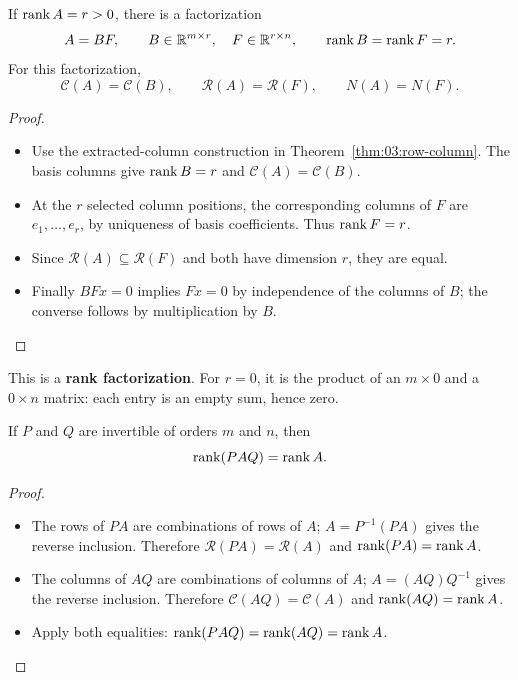 \begin{proposition}\label{prop:03:factorization}
If \(\operatorname{rank} A=r>0\), there is a factorization
\[
A=BF,\qquad B\in\mathbb R^{m\times r},\quad F\in\mathbb R^{r\times n},
\qquad\operatorname{rank} B=\operatorname{rank} F=r.
\]
For this factorization,
\[
\mathcal C(A)=\mathcal C(B),\qquad
\mathcal R(A)=\mathcal R(F),\qquad N(A)=N(F).
\]
\end{proposition}
\begin{proof}
\begin{itemize}
\item Use the extracted-column construction in Theorem~\ref{thm:03:row-column}.
The basis columns give \(\operatorname{rank} B=r\) and \(\mathcal C(A)=\mathcal C(B)\).
\item At the \(r\) selected column positions, the corresponding columns of \(F\)
are \(e_1,\ldots,e_r\), by uniqueness of basis coefficients.
Thus \(\operatorname{rank} F=r\).
\item Since \(\mathcal R(A)\subseteq\mathcal R(F)\)
and both have dimension \(r\), they are equal.
\item Finally \(BFx=0\) implies \(Fx=0\) by independence of the columns of \(B\);
the converse follows by multiplication by \(B\).
\end{itemize}
\end{proof}
This is a \textbf{rank factorization}.
For \(r=0\), it is the product of an \(m\times0\) and
a \(0\times n\) matrix: each entry is an empty sum, hence zero.

\begin{proposition}\label{prop:03:rank-invariance}
If \(P\) and \(Q\) are invertible of orders \(m\) and \(n\), then
\[
\operatorname{rank}(PAQ)=\operatorname{rank} A.
\]
\end{proposition}
\begin{proof}
\begin{itemize}
\item The rows of \(PA\) are combinations of rows of \(A\);
\(A=P^{-1}(PA)\) gives the reverse inclusion. Therefore
\(\mathcal R(PA)=\mathcal R(A)\) and \(\operatorname{rank}(PA)=\operatorname{rank} A\).
\item The columns of \(AQ\) are combinations of columns of \(A\);
\(A=(AQ)Q^{-1}\) gives the reverse inclusion. Therefore
\(\mathcal C(AQ)=\mathcal C(A)\) and \(\operatorname{rank}(AQ)=\operatorname{rank} A\).
\item Apply both equalities: \(\operatorname{rank}(PAQ)=\operatorname{rank}(AQ)=\operatorname{rank} A\).
\end{itemize}
\end{proof}

